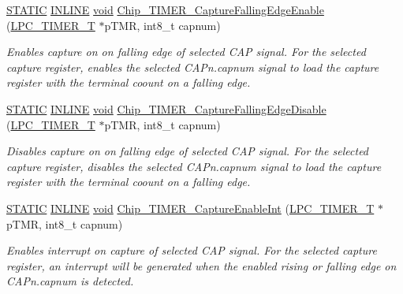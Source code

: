 \begin{DoxyCompactItemize}
\hyperlink{group__LPC__Types__Public__Macros_ga10b2d890d871e1489bb02b7e70d9bdfb}{S\-T\-A\-T\-I\-C} \hyperlink{group__LPC__Types__Public__Types_ga2eb6f9e0395b47b8d5e3eeae4fe0c116}{I\-N\-L\-I\-N\-E} \hyperlink{Paradigm_2Tern__EE_2small_2portmacro_8h_a14d32f8130d3c0b212cfc751730b5b49}{void} \hyperlink{group__TIMER__17XX__40XX_ga9938c5dc5cf1aa81064cf2e14ab29d44}{Chip\-\_\-\-T\-I\-M\-E\-R\-\_\-\-Capture\-Falling\-Edge\-Enable} (\hyperlink{structLPC__TIMER__T}{L\-P\-C\-\_\-\-T\-I\-M\-E\-R\-\_\-\-T} $\ast$p\-T\-M\-R, int8\-\_\-t capnum)
\begin{DoxyCompactList}\small\item\em Enables capture on on falling edge of selected C\-A\-P signal. For the selected capture register, enables the selected C\-A\-Pn.\-capnum signal to load the capture register with the terminal coount on a falling edge. \end{DoxyCompactList}\item 
\hyperlink{group__LPC__Types__Public__Macros_ga10b2d890d871e1489bb02b7e70d9bdfb}{S\-T\-A\-T\-I\-C} \hyperlink{group__LPC__Types__Public__Types_ga2eb6f9e0395b47b8d5e3eeae4fe0c116}{I\-N\-L\-I\-N\-E} \hyperlink{Paradigm_2Tern__EE_2small_2portmacro_8h_a14d32f8130d3c0b212cfc751730b5b49}{void} \hyperlink{group__TIMER__17XX__40XX_ga521a3308abdffb693f4785b739dae98f}{Chip\-\_\-\-T\-I\-M\-E\-R\-\_\-\-Capture\-Falling\-Edge\-Disable} (\hyperlink{structLPC__TIMER__T}{L\-P\-C\-\_\-\-T\-I\-M\-E\-R\-\_\-\-T} $\ast$p\-T\-M\-R, int8\-\_\-t capnum)
\begin{DoxyCompactList}\small\item\em Disables capture on on falling edge of selected C\-A\-P signal. For the selected capture register, disables the selected C\-A\-Pn.\-capnum signal to load the capture register with the terminal coount on a falling edge. \end{DoxyCompactList}\item 
\hyperlink{group__LPC__Types__Public__Macros_ga10b2d890d871e1489bb02b7e70d9bdfb}{S\-T\-A\-T\-I\-C} \hyperlink{group__LPC__Types__Public__Types_ga2eb6f9e0395b47b8d5e3eeae4fe0c116}{I\-N\-L\-I\-N\-E} \hyperlink{Paradigm_2Tern__EE_2small_2portmacro_8h_a14d32f8130d3c0b212cfc751730b5b49}{void} \hyperlink{group__TIMER__17XX__40XX_ga141861bd1b18812fcfd231b8a42065d8}{Chip\-\_\-\-T\-I\-M\-E\-R\-\_\-\-Capture\-Enable\-Int} (\hyperlink{structLPC__TIMER__T}{L\-P\-C\-\_\-\-T\-I\-M\-E\-R\-\_\-\-T} $\ast$p\-T\-M\-R, int8\-\_\-t capnum)
\begin{DoxyCompactList}\small\item\em Enables interrupt on capture of selected C\-A\-P signal. For the selected capture register, an interrupt will be generated when the enabled rising or falling edge on C\-A\-Pn.\-capnum is detected. \end{DoxyCompactList}\item 

\end{DoxyCompactItemize}
